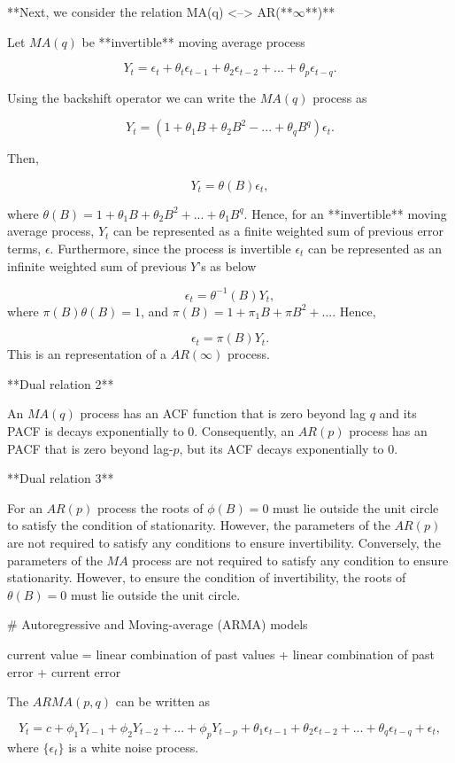 \documentclass[11pt,a4paper,]{article}
\begin{document}
{**Next, we consider the relation MA(q) <--> AR(**$\infty$**)**

Let $MA(q)$ be **invertible** moving average process 

$$Y_t = \epsilon_t + \theta_t\epsilon_{t-1}+\theta_2\epsilon_{t-2}+...+\theta_p\epsilon_{t-q}.$$

Using the backshift operator we can write the $MA(q)$ process as 

$$Y_t = (1+\theta_1B+\theta_2B^2-...+\theta_qB^q)\epsilon_t.$$

Then, 
 
 $$Y_t = \theta(B)\epsilon_t,$$
 
 where $\theta(B)=1+\theta_1B+\theta_2B^2+...+\theta_1B^q.$ Hence, for an **invertible** moving average process, $Y_t$ can be represented as a finite weighted sum of previous error terms, $\epsilon$. Furthermore, since the process is invertible $\epsilon_t$ can be represented as an infinite weighted sum of previous $Y$'s as below
 
 $$\epsilon_t=\theta^{-1}(B)Y_t,$$
where $\pi(B)\theta(B)=1$, and $\pi(B) = 1+\pi_1B+\pi B^2+...$. Hence,

$$\epsilon_t = \pi(B)Y_t.$$ This is an representation of a $AR(\infty)$ process.

**Dual relation 2**

An $MA(q)$ process has an ACF function that is zero beyond lag $q$ and its PACF is decays exponentially to 0. Consequently, an $AR(p)$ process has an PACF that is zero beyond lag-$p$, but its ACF decays exponentially to 0.

**Dual relation 3**

For an $AR(p)$ process the roots of $\phi(B)=0$ must lie outside the unit circle to satisfy the condition of stationarity. However, the parameters of the $AR(p)$ are not required to satisfy any conditions to ensure invertibility. Conversely, the parameters of the $MA$ process are not required to satisfy any condition to ensure stationarity. However, to ensure the condition of invertibility, the roots of $\theta(B)=0$ must lie outside the unit circle.

# Autoregressive and Moving-average (ARMA) models



current value = linear combination of past values + linear combination of past error + current error

The $ARMA(p, q)$ can be written as

$$Y_t=c+\phi_1 Y_{t-1}+\phi_2 Y_{t-2}+...+\phi_p Y_{t-p}+\theta_1\epsilon_{t-1}+\theta_2\epsilon_{t-2}+...+\theta_q\epsilon_{t-q}+\epsilon_t,$$
where $\{\epsilon_t\}$ is a white noise process.

}
\end{document}
